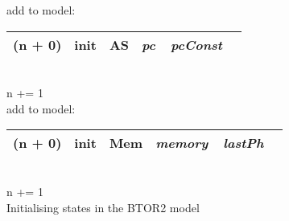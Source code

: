 \begin{algorithm}
    add to model:\\
    \begin{tabular}[h]{>{\ttfamily\color{UniRed}}r >{\ttfamily}l >{\ttfamily\color{UniGrey}}l >{\slshape\color{UniRed}}l >{\slshape} l}
        \hline
        \hline
        \ttfamily
        (n + 0) & init & AS & pc\ \ pcConst & \\
        \hline
        \hline
    \end{tabular}\\
    \textcolor{UniRed}{n} += 1\\
    \BlankLine
    \BlankLine
    add to model:\\
    \begin{tabular}[h]{>{\ttfamily\color{UniRed}}r >{\ttfamily}l >{\ttfamily\color{UniGrey}}l >{\slshape\color{UniRed}}l >{\slshape} l}
        \hline
        \hline
        \ttfamily
        (n + 0) & init & Mem & memory\ \ lastPh & \\
        \hline
        \hline
    \end{tabular}\\
    \textcolor{UniRed}{n} += 1\\
    \caption[Initialising states]{Initialising states in the BTOR2 model}\label{alg:initstate}
\end{algorithm}